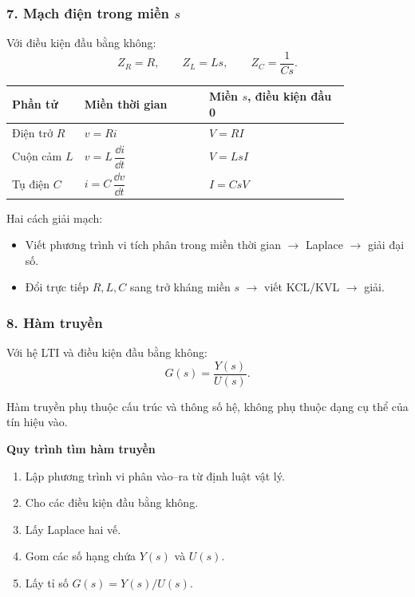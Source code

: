 \medskip
\noindent
{}

\subsubsection*{7. Mạch điện trong miền $s$}

Với điều kiện đầu bằng không:
\[
Z_R=R,\qquad Z_L=Ls,\qquad Z_C=\frac{1}{Cs}.
\]

\begin{center}
\begin{tabular}{|p{0.18\linewidth}|p{0.31\linewidth}|p{0.35\linewidth}|}
\hline
\textbf{Phần tử} & \textbf{Miền thời gian} & \textbf{Miền $s$, điều kiện đầu 0} \\ \hline
Điện trở $R$ & $v=Ri$ & $V=RI$ \\ \hline
Cuộn cảm $L$ & $v=L\,\dfrac{\dd i}{\dd t}$ & $V=LsI$ \\ \hline
Tụ điện $C$ & $i=C\,\dfrac{\dd v}{\dd t}$ & $I=CsV$ \\ \hline
\end{tabular}
\end{center}

Hai cách giải mạch:
\begin{itemize}
  \item Viết phương trình vi tích phân trong miền thời gian $\to$ Laplace $\to$ giải đại số.
  \item Đổi trực tiếp $R,L,C$ sang trở kháng miền $s$ $\to$ viết KCL/KVL $\to$ giải.
\end{itemize}


\subsubsection*{8. Hàm truyền}

Với hệ LTI và điều kiện đầu bằng không:
\[
\boxed{
G(s)=\frac{Y(s)}{U(s)}
}.
\]

Hàm truyền phụ thuộc cấu trúc và thông số hệ, không phụ thuộc dạng cụ thể của tín hiệu vào.

\textbf{Quy trình tìm hàm truyền}
\begin{enumerate}
  \item Lập phương trình vi phân vào--ra từ định luật vật lý.
  \item Cho các điều kiện đầu bằng không.
  \item Lấy Laplace hai vế.
  \item Gom các số hạng chứa $Y(s)$ và $U(s)$.
  \item Lấy tỉ số $G(s)=Y(s)/U(s)$.
\end{enumerate}

